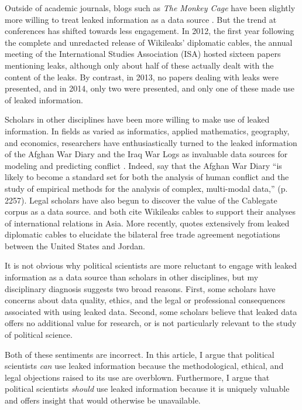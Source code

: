 \documentclass[12pt]{article}
\begin{document}
Outside of academic journals, blogs such as \textit{The Monkey Cage} have been slightly more willing 
to treat leaked information as a data source \citep{voeten2010wikileaks,michael2013united}.
But the trend at conferences has shifted towards less engagement. In 2012, the first year following the 
complete and unredacted release of Wikileaks' diplomatic cables, the annual meeting of the International Studies 
Association (ISA) hosted sixteen papers mentioning leaks, although only about half of these actually dealt 
with the content of the leaks. By contrast, in 2013, no papers dealing with leaks were presented, and in 2014, 
only two were presented, and only one of these made use of leaked information.

Scholars in other disciplines have been more willing to make use of leaked information. 
In fields as varied as informatics, applied mathematics, geography, and economics, researchers have 
enthusiastically turned to the leaked information of the Afghan War Diary and the Iraq War Logs 
as invaluable data sources for modeling and predicting conflict \citep{oloughlin2010peering,linke2012space-time,zammit-mangion2012point,cseke2013sparse,rusch2013model,
zammit-mangion2013modeling}.
Indeed, \citet{dedeo2013bootstrap} say that the Afghan War Diary ``is likely to become 
a standard set for both the analysis of human conflict and the study of empirical methods for the 
analysis of complex, multi-modal data,'' (p. 2257). Legal scholars have also begun to discover 
the value of the Cablegate corpus as a data source. \citet{khoo2011what} and \citet{mendis2012destiny} 
both cite Wikileaks cables to support their analyses of international relations in Asia. 
More recently, \citet{el_said2012morning} quotes extensively from 
leaked diplomatic cables to elucidate the bilateral free trade agreement negotiations between the United States 
and Jordan. 

It is not obvious why political scientists are more reluctant to engage with 
leaked information as a data source than scholars in other disciplines, but my disciplinary 
diagnosis suggests two broad reasons. First, some scholars have concerns about data quality, 
ethics, and the legal or professional consequences associated with using leaked data. 
Second, some scholars believe that leaked data offers no additional value for research, 
or is not particularly relevant to the study of political science.

Both of these sentiments are incorrect. 
In this article, I argue that political scientists \emph{can} use leaked information because 
the methodological, ethical, and legal objections raised to its use are overblown. 
Furthermore, I argue that political scientists \emph{should} use leaked information because it 
is uniquely valuable and offers insight that would otherwise be unavailable.
\end{document}
